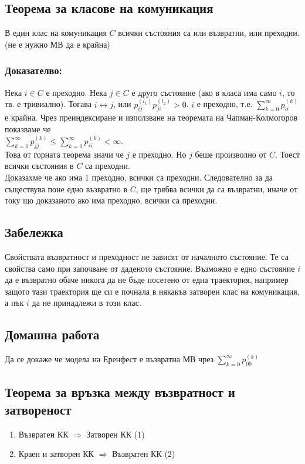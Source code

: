 \documentclass{article}
\begin{document}
\subsection{Теорема за класове на комуникация}
В един клас на комуникация $C$ всички състояния са или възвратни, или преходни. (не е нужно МВ да е крайна)

\subsubsection*{Доказателво:}
Нека $i \in C$ е преходно. Нека $j \in C$ е друго състояние (ако в класа има само $i$, то тв. е тривиално). 
Тогава $i \leftrightarrow j$, или $p_{ij}^{(l_1)}p_{ji}^{(l_2)} > 0$. $i$ е преходно, т.е. $\sum_{k=0}^\infty p_{ii}^{(k)}$ е крайна. 
Чрез преиндексиране и използване на теоремата на Чапман-Колмогоров показваме че \\
$\sum_{k=0}^\infty p_{jj}^{(k)} \leq \sum_{k=0}^\infty p_{ii}^{(k)} < \infty$. \\ Това от горната теорема значи 
че $j$ е преходно. Но $j$ беше произволно от $C$. Тоест всички състояния в $C$ са преходни. \\
Доказахме че ако има 1 преходно, всички са преходни. Следователно за да съществува поне 
едно възвратно в $C$, ще трябва всички да са възвратни, иначе от току що доказаното 
ако има преходно, всички са преходни.

\subsection{Забележка}
Свойствата възвратност и преходност не зависят от началното състояние. 
Те са свойства само при започване от даденото състояние. Възможно е едно състояние $i$ да 
е възвратно обаче никога да не бъде посетено от една траектория, 
например защото тази траектория ще си е почнала в някакъв затворен клас на комуникация, 
а пък $i$ да не принадлежи в този клас.

\subsection*{Домашна работа}
Да се докаже че модела на Еренфест е възвратна МВ чрез $\sum_{k=0}^\infty p_{00}^{(k)}$

\subsection{Теорема за връзка между възвратност и затвореност}
\begin{enumerate}
\item Възвратен КК $\Rightarrow$ Затворен КК \quad (1)
\item Краен и затворен КК $\Rightarrow$ Възвратен КК \quad (2)
\end{enumerate}
\end{document}
